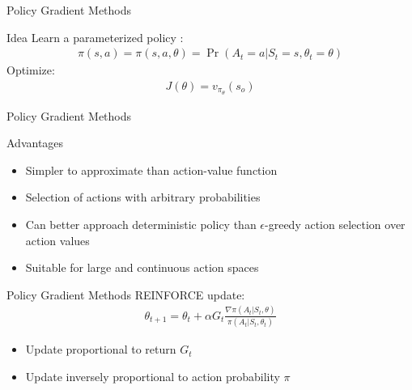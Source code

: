 \documentclass[ignorenonframetext,xcolor=x11names]{beamer}
\begin{document}
\begin{frame}[label=full]{Policy Gradient Methods}
\begin{block}{Idea}
Learn a parameterized policy :
\begin{align*}
\pi(s, a) = \pi(s, a, \theta) = \Pr(A_t = a | S_t = s, \theta_t = \theta)
\end{align*}
Optimize:
\begin{align*}
J(\theta) = v_{\pi_\theta}(s_o)
\end{align*}
\end{block}
\end{frame}

\begin{frame}[label=full]{Policy Gradient Methods}
\begin{block}{Advantages}
\begin{itemize}
   \item Simpler to approximate than action-value function
   \item Selection of actions with arbitrary probabilities
   \item Can better approach deterministic policy than $\epsilon$-greedy action selection over action values
   \item Suitable for large and continuous action spaces
\end{itemize}
\end{block}
\end{frame}

\begin{frame}[label=full]{Policy Gradient Methods}
REINFORCE update:
\begin{align*}
\theta_{t+1} = \theta_t + \alpha G_t \frac{\nabla \pi(A_t | S_t, \theta)}{\pi(A_t | S_t, \theta_t)}
\end{align*}
\begin{itemize}
   \item Update proportional to return $G_t$
   \item Update inversely proportional to action probability $\pi$
\end{itemize}
\end{frame}
\end{document}
